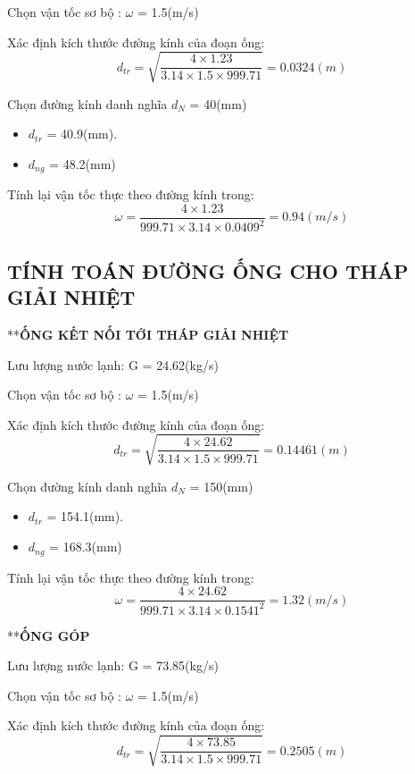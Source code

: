 Chọn vận tốc sơ bộ : $\omega$ = 1.5(m/s)

Xác định kích thước đường kính của đoạn ống:
\begin{equation*}
	d_{tr} = \sqrt{\dfrac{4 \times 1.23}{3.14 \times 1.5 \times 999.71}} =0.0324 (m)
\end{equation*}

Chọn đường kính danh nghĩa $d_{N}$ = 40(mm)
\begin{itemize}
	\item $d_{tr}$ = 40.9(mm).
	\item $d_{ng}$ = 48.2(mm)
\end{itemize}

Tính lại vận tốc thực theo đường kính trong:
\begin{equation*}
	\omega = \dfrac{4 \times 1.23 }{999.71 \times 3.14 \times 0.0409^{2}} = 0.94(m/s)
\end{equation*}

\subsection{TÍNH TOÁN ĐƯỜNG ỐNG CHO THÁP GIẢI NHIỆT}

**\textbf{ỐNG KẾT NỐI TỚI THÁP GIẢI NHIỆT}

Lưu lượng nước lạnh: G = 24.62(kg/s)

Chọn vận tốc sơ bộ : $\omega$ = 1.5(m/s)

Xác định kích thước đường kính của đoạn ống:
\begin{equation*}
	d_{tr} = \sqrt{\dfrac{4 \times 24.62}{3.14 \times 1.5 \times 999.71}} =0.14461 (m)
\end{equation*}

Chọn đường kính danh nghĩa $d_{N}$ = 150(mm)
\begin{itemize}
	\item $d_{tr}$ = 154.1(mm).
	\item $d_{ng}$ = 168.3(mm)
\end{itemize}

Tính lại vận tốc thực theo đường kính trong:
\begin{equation*}
	\omega = \dfrac{4 \times 24.62 }{999.71 \times 3.14 \times 0.1541^{2}} = 1.32(m/s)
\end{equation*}

**\textbf{ỐNG GÓP}

Lưu lượng nước lạnh: G = 73.85(kg/s)

Chọn vận tốc sơ bộ : $\omega$ = 1.5(m/s)

Xác định kích thước đường kính của đoạn ống:
\begin{equation*}
	d_{tr} = \sqrt{\dfrac{4 \times 73.85}{3.14 \times 1.5 \times 999.71}} =0.2505 (m)
\end{equation*}

